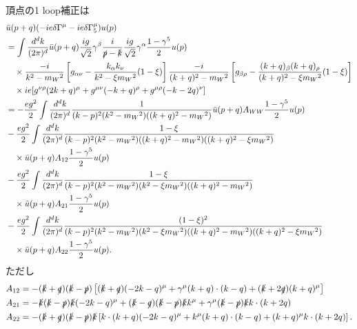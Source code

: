 頂点の1 loop補正は
\begin{align*}
  & \bar{u}(p+q) (-ie\delta\Gamma^\mu-ie\delta\Gamma_5^\mu) u(p) \\
  &= \int \frac{d^dk}{(2\pi)^d} \bar{u}(p+q) \frac{ig}{\sqrt{2}} \gamma^\beta \frac{i}{\slashed{p}-\slashed{k}} \frac{ig}{\sqrt{2}} \gamma^\alpha \frac{1-\gamma^5}{2} u(p) \\
  &\quad\times \frac{-i}{k^2-m_W{}^2} \left[ g_{\alpha\nu} - \frac{k_\alpha k_\nu}{k^2-\xi m_W{}^2}(1-\xi) \right]
  \frac{-i}{(k+q)^2-m_W{}^2} \left[ g_{\beta\rho} - \frac{(k+q)_\beta (k+q)_\rho}{(k+q)^2-\xi m_W{}^2}(1-\xi) \right] \\
  &\quad\times ie [ g^{\nu\rho} (2k+q)^\mu + g^{\mu\nu} (-k+q)^\rho + g^{\mu\rho} (-k-2q)^\nu ] \\
  &= - \frac{eg^2}{2} \int \frac{d^dk}{(2\pi)^d} \frac{1}{(k-p)^2 (k^2 - m_W{}^2) ((k+q)^2 - m_W{}^2)} \bar{u}(p+q) A_{WW} \frac{1-\gamma^5}{2} u(p) \\
  & - \frac{eg^2}{2} \int \frac{d^dk}{(2\pi)^d} \frac{1-\xi}{(k-p)^2 (k^2 - m_W{}^2) ((k+q)^2 - m_W{}^2) ((k+q)^2 - \xi m_W{}^2)} \\
  &\quad\times \bar{u}(p+q) A_{12} \frac{1-\gamma^5}{2} u(p) \\
  & - \frac{eg^2}{2} \int \frac{d^dk}{(2\pi)^d} \frac{1-\xi}{(k-p)^2 (k^2 - m_W{}^2) (k^2 - \xi m_W{}^2) ((k+q)^2 - m_W{}^2)} \\
  &\quad\times \bar{u}(p+q) A_{21} \frac{1-\gamma^5}{2} u(p) \\
  & - \frac{eg^2}{2} \int \frac{d^dk}{(2\pi)^d} \frac{(1-\xi)^2}{(k-p)^2 (k^2 - m_W{}^2) (k^2 - \xi m_W{}^2) ((k+q)^2 - m_W{}^2) ((k+q)^2 - \xi m_W{}^2)} \\
  &\quad\times \bar{u}(p+q) A_{22} \frac{1-\gamma^5}{2} u(p) .
\end{align*}
ただし
\begin{align*}
  A_{12} &= - (\slashed{k}+\slashed{q}) (\slashed{k}-\slashed{p})
  \left[ (\slashed{k}+\slashed{q}) (-2k-q)^\mu + \gamma^\mu (k+q) \cdot (k-q) + (\slashed{k}+2\slashed{q}) (k+q)^\mu \right] \\
  A_{21} &= - \slashed{k} (\slashed{k}-\slashed{p}) \slashed{k} (-2k-q)^\mu
  + (\slashed{k}-\slashed{q}) (\slashed{k}-\slashed{p}) \slashed{k} k^\mu
  + \gamma^\mu (\slashed{k}-\slashed{p}) \slashed{k} k \cdot(k+2q) \\
  A_{22} &= - (\slashed{k}+\slashed{q}) (\slashed{k}-\slashed{p}) \slashed{k}
  \left[ k\cdot(k+q) (-2k-q)^\mu + k^\mu (k+q)\cdot(k-q) + (k+q)^\mu k\cdot(k+2q) \right] .
\end{align*}

